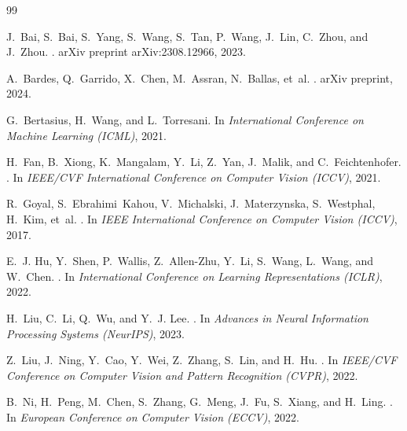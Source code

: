 \documentclass[10pt,twocolumn,letterpaper]{article}
\begin{document}
{\small
\begin{thebibliography}{99}

J.~Bai, S.~Bai, S.~Yang, S.~Wang, S.~Tan, P.~Wang, J.~Lin, C.~Zhou, and J.~Zhou.
.
\newblock arXiv preprint arXiv:2308.12966, 2023.

A.~Bardes, Q.~Garrido, X.~Chen, M.~Assran, N.~Ballas, et~al.
.
\newblock arXiv preprint, 2024.

G.~Bertasius, H.~Wang, and L.~Torresani.
\newblock In \emph{International Conference on Machine Learning (ICML)}, 2021.

H.~Fan, B.~Xiong, K.~Mangalam, Y.~Li, Z.~Yan, J.~Malik, and C.~Feichtenhofer.
.
\newblock In \emph{IEEE/CVF International Conference on Computer Vision (ICCV)}, 2021.

R.~Goyal, S.~Ebrahimi~Kahou, V.~Michalski, J.~Materzynska, S.~Westphal, H.~Kim, et~al.
.
\newblock In \emph{IEEE International Conference on Computer Vision (ICCV)}, 2017.

E.~J. Hu, Y.~Shen, P.~Wallis, Z.~Allen-Zhu, Y.~Li, S.~Wang, L.~Wang, and W.~Chen.
.
\newblock In \emph{International Conference on Learning Representations (ICLR)}, 2022.

H.~Liu, C.~Li, Q.~Wu, and Y.~J. Lee.
.
\newblock In \emph{Advances in Neural Information Processing Systems (NeurIPS)}, 2023.

Z.~Liu, J.~Ning, Y.~Cao, Y.~Wei, Z.~Zhang, S.~Lin, and H.~Hu.
.
\newblock In \emph{IEEE/CVF Conference on Computer Vision and Pattern Recognition (CVPR)}, 2022.

B.~Ni, H.~Peng, M.~Chen, S.~Zhang, G.~Meng, J.~Fu, S.~Xiang, and H.~Ling.
.
\newblock In \emph{European Conference on Computer Vision (ECCV)}, 2022.


\end{thebibliography}}
\end{document}
